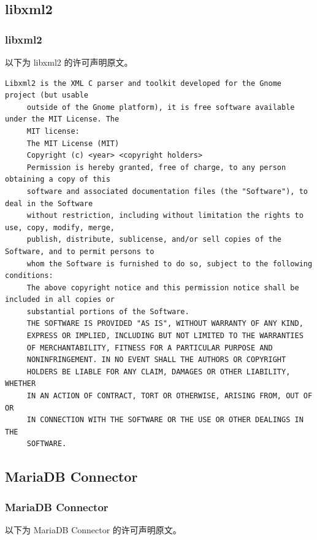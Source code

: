 \subsection{libxml2}
\subsubsection*{libxml2}

以下为 libxml2 的许可声明原文。

\begin{lstlisting}[basicstyle=\ttfamily\footnotesize,breaklines=true]
     Libxml2 is the XML C parser and toolkit developed for the Gnome project (but usable
     outside of the Gnome platform), it is free software available under the MIT License. The
     MIT license:
     The MIT License (MIT)
     Copyright (c) <year> <copyright holders>
     Permission is hereby granted, free of charge, to any person obtaining a copy of this
     software and associated documentation files (the "Software"), to deal in the Software
     without restriction, including without limitation the rights to use, copy, modify, merge,
     publish, distribute, sublicense, and/or sell copies of the Software, and to permit persons to
     whom the Software is furnished to do so, subject to the following conditions:
     The above copyright notice and this permission notice shall be included in all copies or
     substantial portions of the Software.
     THE SOFTWARE IS PROVIDED "AS IS", WITHOUT WARRANTY OF ANY KIND,
     EXPRESS OR IMPLIED, INCLUDING BUT NOT LIMITED TO THE WARRANTIES
     OF MERCHANTABILITY, FITNESS FOR A PARTICULAR PURPOSE AND
     NONINFRINGEMENT. IN NO EVENT SHALL THE AUTHORS OR COPYRIGHT
     HOLDERS BE LIABLE FOR ANY CLAIM, DAMAGES OR OTHER LIABILITY, WHETHER
     IN AN ACTION OF CONTRACT, TORT OR OTHERWISE, ARISING FROM, OUT OF OR
     IN CONNECTION WITH THE SOFTWARE OR THE USE OR OTHER DEALINGS IN THE
     SOFTWARE.
\end{lstlisting}

\subsection{MariaDB Connector}
\subsubsection*{MariaDB Connector}

以下为 MariaDB Connector 的许可声明原文。

